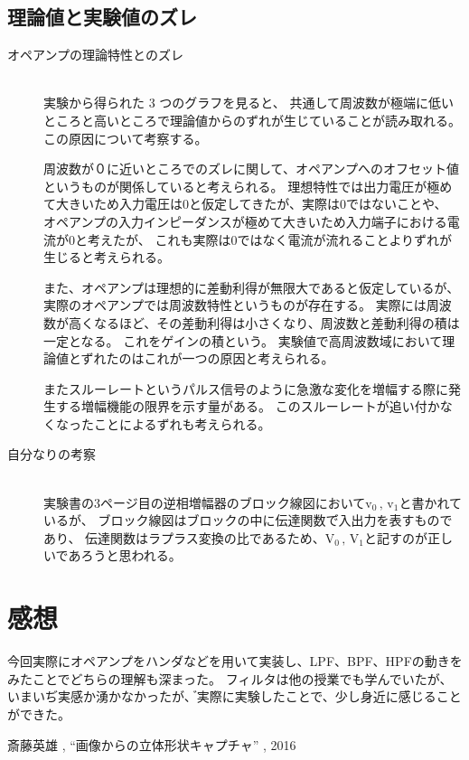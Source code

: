 \documentclass[11pt,a4j]{jsarticle}
\begin{document}
\subsection{理論値と実験値のズレ}
\label{sub:理論値と実験値のズレ}

\begin{description}
  \item[オペアンプの理論特性とのズレ]\mbox{}\\
  実験から得られた 3 つのグラフを見ると、
  共通して周波数が極端に低いところと高いところで理論値からのずれが生じていることが読み取れる。
  この原因について考察する。

  周波数が０に近いところでのズレに関して、オペアンプへのオフセット値というものが関係していると考えられる。
  理想特性では出力電圧が極めて大きいため入力電圧は0と仮定してきたが、実際は0ではないことや、
  オペアンプの入力インピーダンスが極めて大きいため入力端子における電流が0と考えたが、
  これも実際は0ではなく電流が流れることよりずれが生じると考えられる。

  また、オペアンプは理想的に差動利得が無限大であると仮定しているが、
  実際のオペアンプでは周波数特性というものが存在する。
  実際には周波数が高くなるほど、その差動利得は小さくなり、周波数と差動利得の積は一定となる。
  これをゲインの積という。 実験値で高周波数域において理論値とずれたのはこれが一つの原因と考えられる。

  またスルーレートというパルス信号のように急激な変化を増幅する際に発生する増幅機能の限界を示す量がある。
  このスルーレートが追い付かなくなったことによるずれも考えられる。
  \item[自分なりの考察]\mbox{}\\
  実験書の3ページ目の逆相増幅器のブロック線図において$\mathrm{v_0 \, , \, v_1}$と書かれているが、
  ブロック線図はブロックの中に伝達関数で゙入出力を表すものであり、
  伝達関数はラプラス変換の比であるため、$\mathrm{V_0 \, , \, V_1}$と記すのが正しいであろうと思われる。
\end{description}

\section{感想}
\label{sec:感想}

今回実際にオペアンプをハンダなどを用いて実装し、LPF、BPF、HPFの動きをみたことでどちらの理解も深まった。
フィルタは他の授業でも学んでいたが、いまいぢ実感か湧かなかったが、゙実際に実験したことで、少し身近に感じることができた。



\begin{thebibliography}{9} %
 斎藤英雄 , ``画像からの立体形状キャプチャ'' , 2016
\end{thebibliography}
\end{document}
